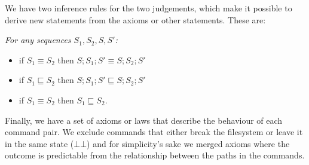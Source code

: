 \documentclass[12pt]{article}
\newcommand{\empt}{\bot}
\newcommand{\fscommand}[2]{{#1#2}}
\newcommand{\fsregcommandchar}[1]{\mathtt{#1}}
\newcommand{\fsregcommand}[2]{\fscommand{\fsregcommandchar{#1}}{\fsregcommandchar{#2}}}
\newcommand{\cbb}{\fsregcommand{\empt}{\empt}}
\newcommand{\eqext}{\sqsubseteq}
\theoremstyle{definition}
\begin{document}
We have two inference rules for the two judgements,
which make it possible to derive new statements from the axioms or other statements.
These are:

\emph{For any sequences \(S_1, S_2, S, S'\):}
\begin{itemize}
\item if \(S_1\equiv S_2\) then \(S;S_1;S'\equiv S;S_2;S'\)
\item if \(S_1\eqext S_2\) then \(S;S_1;S'\eqext S;S_2;S'\)
\item if \(S_1\equiv S_2\) then \(S_1\eqext S_2\).
\end{itemize}

Finally, we have a set of axioms or laws that describe the behaviour
of each command pair. We exclude commands that either break the
filesystem or leave it in the same state ($\cbb$) and for
simplicity's sake we merged axioms where the outcome is predictable
from the relationship between the paths in the commands.
\end{document}

